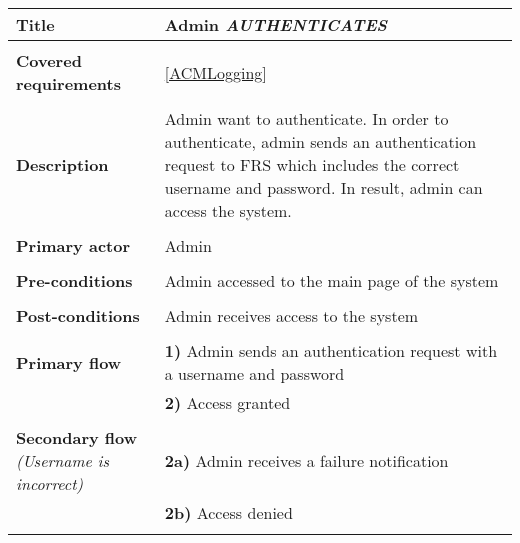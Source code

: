 \documentclass[a4paper,11pt]{article}
\begin{document}
\begin{tabular}{|p{3.5cm}|p{11.5cm}|} \hline
    \textbf{Title} &   Admin \emph{AUTHENTICATES}

    \\ \hline \rowcolor{Gray} & \\ \hline

    \textbf{Covered requirements} &  \ref{ACMLogging}
  
    \\ \hline \rowcolor{Gray} & \\ \hline 
  
    \textbf{Description} &  Admin want to authenticate. In order to authenticate, admin sends an authentication request to FRS which includes the correct username and password. In result, admin can access the system. 
   
    \\ \hline \rowcolor{Gray} & \\ \hline 
   
    \textbf{Primary actor} & Admin   
   
    \\ \hline \rowcolor{Gray} & \\ \hline  
   
    \textbf{Pre-conditions} &   Admin accessed to the main page of the system 
   
    \\ \hline \rowcolor{Gray} & \\ \hline 
   
    \textbf{Post-conditions} &   Admin receives access to the system 
   
    \\ \hline \rowcolor{Gray} & \\ \hline  
   
    \textbf{Primary flow} &  
    \textbf{1)} Admin sends an authentication request with a username and password  \\& 
    \textbf{2)} Access granted
    
    \\ \hline \rowcolor{Gray} & \\ \hline  
   
    \textbf{Secondary flow} \emph{(Username is incorrect)} &  
    \textbf{2a)} Admin receives a failure notification \\ &
    \textbf{2b)} Access denied
    
    \\ \hline \rowcolor{Gray} & \\ \hline  
    

\end{tabular}
\end{document}
